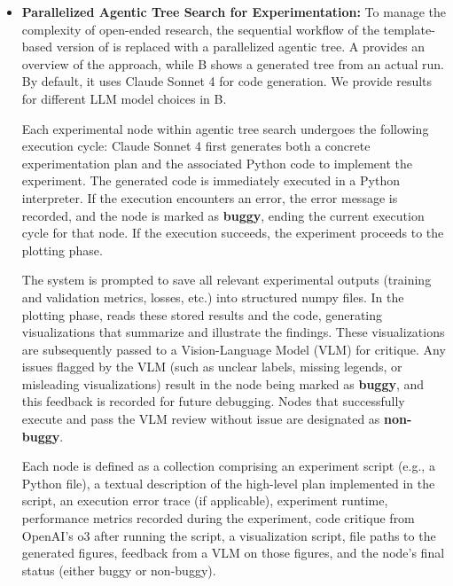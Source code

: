 \begin{itemize}
    \item \textbf{Parallelized Agentic Tree Search for Experimentation:}
    To manage the complexity of open-ended research, the sequential workflow of the template-based version of \ouralgo is replaced with a parallelized agentic tree. 
    A provides an overview of the approach, while B shows a generated tree from an actual run.
    By default, it uses Claude Sonnet 4 for code generation. We provide results for different LLM model choices in B.
    
Each experimental node within agentic tree search undergoes the following execution cycle: Claude Sonnet 4 first generates both a concrete experimentation plan and the associated Python code to implement the experiment. The generated code is immediately executed in a Python interpreter. If the execution encounters an error, the error message is recorded, and the node is marked as \textbf{buggy}, ending the current execution cycle for that node. If the execution succeeds, the experiment proceeds to the plotting phase. %

The system is prompted to save all relevant experimental outputs (training and validation metrics, losses, etc.) into structured numpy files. In the plotting phase, \ouralgo reads these stored results and the code, generating visualizations that summarize and illustrate the findings. These visualizations are subsequently passed to a Vision-Language Model (VLM) for critique. Any issues flagged by the VLM (such as unclear labels, missing legends, or misleading visualizations) result in the node being marked as \textbf{buggy}, and this feedback is recorded for future debugging. Nodes that successfully execute and pass the VLM review without issue are designated as \textbf{non-buggy}.

Each node is defined as a collection comprising an experiment script (e.g., a Python file), a textual description of the high-level plan implemented in the script, an execution error trace (if applicable), experiment runtime, performance metrics recorded during the experiment, code critique from OpenAI's o3 after running the script, a visualization script, file paths to the generated figures, feedback from a VLM on those figures, and the node's final status (either buggy or non-buggy).


\end{itemize}
